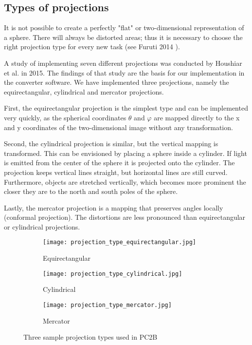 \subsection{Types of projections} \label{section_types_of_projections}

It is not possible to create a perfectly "flat" or two-dimensional representation of a sphere. There will always be distorted areas; thus it is necessary to choose the right projection type for every new task (see Furuti 2014 \parencite{panoramaProblem} ).

A study of implementing seven different projections was conducted by Houshiar et al. \parencite{houshiar2015a} in 2015. The findings of that study are the basis for our implementation in the converter software. We have implemented three projections, namely the equirectangular, cylindrical and mercator projections.

First, the equirectangular projection is the simplest type and can be implemented very quickly, as the spherical coordinates {$\theta$} and {$\varphi$} are mapped directly to the x and y coordinates of the two-dimensional image without any transformation.

Second, the cylindrical projection is similar, but the vertical mapping is transformed. This can be envisioned by placing a sphere inside a cylinder. If light is emitted from the center of the sphere it is projected onto the cylinder. The projection keeps vertical lines straight, but horizontal lines are still curved. Furthermore, objects are stretched vertically, which becomes more prominent the closer they are to the north and south poles of the sphere.

Lastly, the mercator projection is a mapping that preserves angles locally (conformal projection). The distortions are less pronounced than equirectangular or cylindrical projections.

\begin{figure}[h]
	\centering
	\begin{subfigure}[b]{0.3\textwidth}
		\centering
		\texttt{[image: projection\_type\_equirectangular.jpg]}
		\caption{Equirectangular}
		\label{fig:equirectangular}
	\end{subfigure}
	\hfill
	\begin{subfigure}[b]{0.3\textwidth}
		\centering
		\texttt{[image: projection\_type\_cylindrical.jpg]}
		\caption{Cylindrical}
		\label{fig:cylindrical}
	\end{subfigure}
	\hfill
	\begin{subfigure}[b]{0.3\textwidth}
		\centering
		\texttt{[image: projection\_type\_mercator.jpg]}
		\caption{Mercator}
		\label{fig:mercator}
	\end{subfigure}
	\caption{Three sample projection types used in PC2B}
	\label{fig:three_projections}
\end{figure}

